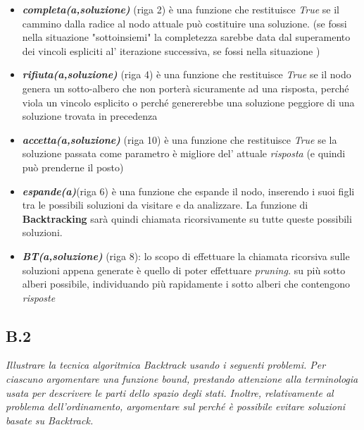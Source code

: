 \documentclass[a4paper]{article}
\newcommand{\imp}[1]{\textbf{\textit{#1}}}
\begin{document}
\begin{itemize}
	\item \imp{completa(a,soluzione)} (riga 2) è una funzione che restituisce \textit{True} se il cammino dalla radice al nodo attuale può costituire una soluzione. (se fossi nella situazione "sottoinsiemi" la completezza sarebbe data dal superamento dei vincoli espliciti al' iterazione successiva, se fossi nella situazione )
	\item \imp{rifiuta(a,soluzione)} (riga 4) è una funzione che restituisce \textit{True} se il nodo genera un sotto-albero che non porterà sicuramente ad una risposta, perché viola un vincolo esplicito o perché genererebbe una soluzione peggiore di una soluzione trovata in precedenza
	\item \imp{accetta(a,soluzione)} (riga 10) è una funzione che restituisce \textit{True} se la soluzione passata come parametro è migliore del' attuale \textit{risposta} (e quindi può prenderne il posto)
	\item \imp{espande(a)}(riga 6) è una funzione che espande il nodo, inserendo i suoi figli tra le possibili soluzioni da visitare e da analizzare. La funzione di \textbf{Backtracking} sarà quindi chiamata ricorsivamente su tutte queste possibili soluzioni.
	\item \imp{BT(a,soluzione)} (riga 8): lo scopo di effettuare la chiamata ricorsiva sulle soluzioni appena generate è quello di poter effettuare \textit{pruning.} su più sotto alberi possibile, individuando più rapidamente i sotto alberi che contengono \textit{risposte}
\end{itemize}
\subsection{B.2}
\emph{Illustrare la tecnica algoritmica Backtrack usando i seguenti problemi. Per ciascuno argomentare una funzione bound, prestando attenzione alla terminologia usata per descrivere le parti dello spazio degli stati. Inoltre, relativamente al problema dell'ordinamento, argomentare sul perché è possibile evitare soluzioni basate su Backtrack.}
\end{document}
